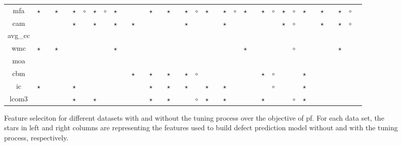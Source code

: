 \documentclass{sig-alternative}
\begin{document}
\begin{figure}[!ht]
\begin{tabular}{c|c c|c c|c c|c c|c c|c c|c c|c c|c c|c c|c c|c c|c c|c c|c c|c c|c c|c }
mfa& $\star$& & $\star$& & $\star$& $\circ$& $\star$& $\circ$& $\star$& & & & $\star$& & $\star$& & $\star$& $\circ$& $\star$& & $\star$& $\circ$& $\star$& & $\star$& $\circ$& $\star$& $\circ$& $\star$& & $\star$& & $\star$& $\circ$\\
cam& & & & & $\star$& & $\star$& & $\star$& & $\star$& & & & & & $\star$& & & & $\star$& & & & & & $\star$& $\circ$& & & $\star$& & $\star$& $\circ$\\
avg\_cc& & & & & & & & & & & & & & & & & & & & & & & & & & & & & & & & & & \\
wmc& $\star$& & $\star$& & & & & & $\star$& & & & & & & & & & & & & & $\star$& & & & & $\circ$& & & & & $\star$& \\
moa& & & & & & & & & & & & & & & & & & & & & & & & & & & & & & & & & & \\
cbm& & & & & & & & & & & $\star$& & $\star$& & $\star$& & $\star$& $\circ$& & & & & & & $\star$& $\circ$& & & $\star$& & & & & \\
ic& $\star$& & & & $\star$& & & & & & & & $\star$& & $\star$& & $\star$& & $\star$& & $\star$& & & & & $\circ$& & & $\star$& & & & & \\
lcom3& & & & & $\star$& & $\star$& & & & & & $\star$& & $\star$& & & $\circ$& $\star$& & $\star$& & & & $\star$& & & $\circ$& $\star$& & & & & \\

  \end{tabular}
      \caption{Feature seleciton for different datasets with  and without the tuning process over the objective of pf. For each data set, the stars in left and right columns are representing the features used to build defect prediction model without and with the tuning process, respectively.
 }
\end{figure}
\end{document}
